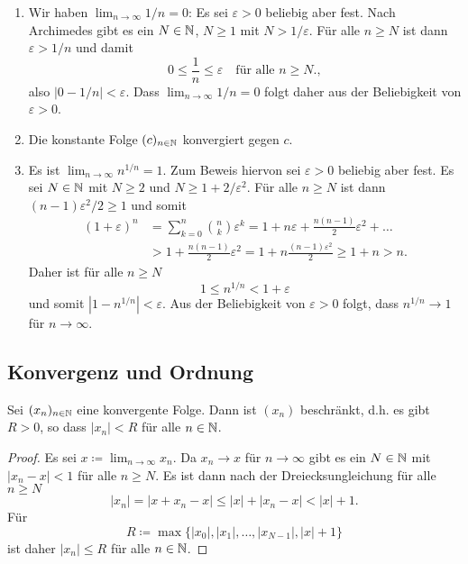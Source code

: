 \documentclass[a4paper,10pt]{article}
\begin{document}
\begin{bsp}
 \begin{enumerate}
  \item
   Wir haben $\lim_{n \to \infty} 1/n = 0$: Es sei $\varepsilon > 0$ beliebig aber fest. Nach Archimedes gibt es ein $N \in \mathbb{N}$, $N \geq 1$ mit $N > 1/\varepsilon$. Für alle $n \geq N$ ist dann $\varepsilon > 1/n$ und damit
   \[
    0 \leq \frac{1}{n} \leq \varepsilon \quad \text{für alle $n \geq N$}.,
   \]
   also $|0 - 1/n| < \varepsilon$. Dass $\lim_{n \to \infty} 1/n = 0$ folgt daher aus der Beliebigkeit von $\varepsilon > 0$.
  \item
   Die konstante Folge $(c)_{n \in \mathbb{N}}$ konvergiert gegen $c$.
  \item
   Es ist $\lim_{n \to \infty} n^{1/n} = 1$. Zum Beweis hiervon sei $\varepsilon > 0$ beliebig aber fest. Es sei $N \in \mathbb{N}$ mit $N \geq 2$ und $N \geq 1 + 2/\varepsilon^2$. Für alle $n \geq N$ ist dann $(n-1)\varepsilon^2/2 \geq 1$ und somit
   \begin{align*}
    (1+\varepsilon)^n
    &= \sum_{k=0}^n \binom{n}{k} \varepsilon^k
    = 1 + n \varepsilon + \frac{n(n-1)}{2}\varepsilon^2 + \dotso \\
    &> 1 + \frac{n(n-1)}{2}\varepsilon^2
    = 1 + n \frac{(n-1)\varepsilon^2}{2}
    \geq 1 + n
    > n.
   \end{align*}
  Daher ist für alle $n \geq N$
  \[
   1 \leq n^{1/n} < 1 + \varepsilon
  \]
  und somit $|1 - n^{1/n}| < \varepsilon$. Aus der Beliebigkeit von $\varepsilon > 0$ folgt, dass $n^{1/n} \to 1$ für $n \to \infty$.
 \end{enumerate}
\end{bsp}





\subsection{Konvergenz und Ordnung}


\begin{lem}
 Sei $(x_n)_{n \in \mathbb{N}}$ eine konvergente Folge. Dann ist $(x_n)$ beschränkt, d.h. es gibt $R > 0$, so dass $|x_n| < R$ für alle $n \in \mathbb{N}$.
\end{lem}
\begin{proof}
 Es sei $x \coloneqq \lim_{n \to \infty} x_n$. Da $x_n \to x$ für $n \to \infty$ gibt es ein $N \in \mathbb{N}$ mit $|x_n - x| < 1$ für alle $n \geq N$. Es ist dann nach der Dreiecksungleichung für alle $n \geq N$
 \[
  |x_n|
  = |x + x_n - x|
  \leq |x| + |x_n - x|
  < |x| + 1.
 \]
 Für
 \[
  R \coloneqq \max \{|x_0|, |x_1|, \dotsc, |x_{N-1}|, |x| + 1\}
 \]
 ist daher $|x_n| \leq R$ für alle $n \in \mathbb{N}$.
\end{proof}
\end{document}
